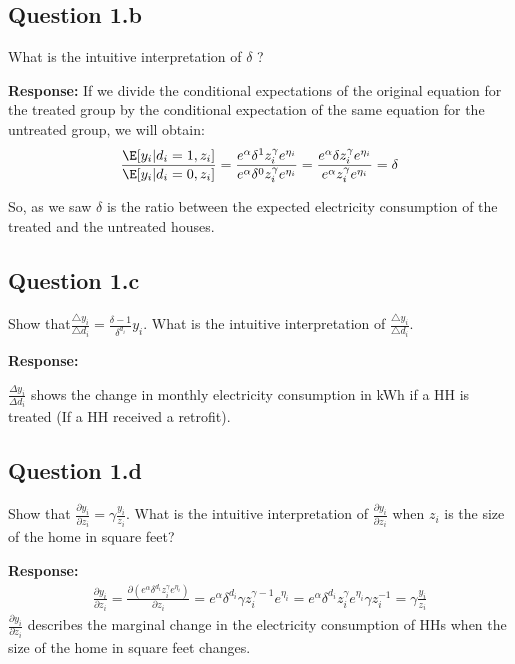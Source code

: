 \documentclass{article}
\begin{document}
\subsection*{Question 1.b} What is the intuitive interpretation of \(\delta\) ? 

\textbf{Response:} 
If we divide the conditional expectations of the original equation for the treated group by the conditional expectation of the same equation for the untreated group, we will obtain: 
       \begin{align}
       \frac{\E[y_i|d_i=1,z_i]}{\E[y_i|d_i=0,z_i]} = \frac{e^\alpha\delta^1 z_i^{\gamma}e^{\eta_i}}{e^\alpha \delta^0 z_i^{\gamma}e^{\eta_i}} = \frac{e^\alpha\delta z_i^{\gamma}e^{\eta_i}}{e^\alpha z_i^{\gamma}e^{\eta_i}} = \delta
    \end{align}
           
So, as we saw \(\delta\) is the ratio between the expected electricity consumption of the treated and the untreated houses.

\subsection*{Question 1.c} Show that\(\frac{\triangle y_i}{\triangle d_i} = \frac{\delta -1}{\delta^{d_i}} y_i \). What is the intuitive interpretation of \(\frac{\triangle y_i}{\triangle d_i} \).

\textbf{Response:} 

\(\frac{\Delta y_i}{\Delta d_i}\) shows the change in monthly electricity consumption in kWh if a HH is treated (If a HH received a retrofit).

\subsection*{Question 1.d} Show that \(\frac{\partial y_i}{\partial z_i} = \gamma \frac{y_i}{z_i}\). What is the intuitive interpretation of \(\frac{\partial y_i}{\partial z_i}\) when \(z_i\) is the size of the home in square feet?

\textbf{Response:}
\begin{align}
    \frac{\partial y_i}{\partial z_i} = \frac{\partial (e^{\alpha} \delta^{d_i} z_i^\gamma e^{\eta_i})}{\partial z_i} = 
                                       e^{\alpha} \delta^{d_i} \gamma z_i^{\gamma - 1} e^{\eta_i} = 
                                      e^{\alpha} \delta^{d_i} z_i^\gamma e^{\eta_i} \gamma z_i^{- 1} = 
                                      \gamma \frac{y_i}{z_i}
                                      \end{align}
\(\frac{\partial y_i}{\partial z_i}\) describes the marginal change in the electricity consumption of HHs when the size of the home in square feet changes. 
\end{document}
